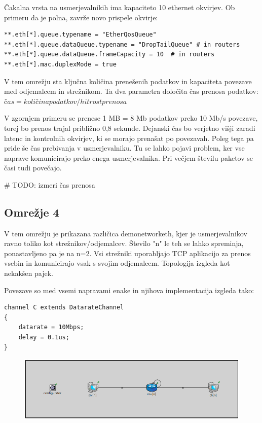 \documentclass[11pt,a4paper,slovene]{myarticle}
\begin{document}
Čakalna vrsta na usmerjevalnikih ima kapaciteto 10 ethernet okvirjev. Ob primeru da je polna, zavrže novo prispele okvirje:
\begin{lstlisting}[h]
**.eth[*].queue.typename = "EtherQosQueue"
**.eth[*].queue.dataQueue.typename = "DropTailQueue" # in routers
**.eth[*].queue.dataQueue.frameCapacity = 10  # in routers
**.eth[*].mac.duplexMode = true
\end{lstlisting}

V tem omrežju sta ključna količina prenešenih podatkov in kapaciteta povezave med odjemalcem in strežnikom. Ta dva parametra določita čas prenosa podatkov:
$čas = količina podatkov / hitrost prenosa$

V zgornjem primeru se prenese 1 MB = 8 Mb podatkov preko 10 Mb/s povezave, torej bo prenos trajal približno 0,8 sekunde. Dejanski čas bo verjetno višji zaradi latenc in kontrolnih okvirjev, ki se morajo prenašat po povezavah.
Poleg tega pa pride še čas prebivanja v usmerjevalniku. Tu se lahko pojavi problem, ker vse naprave komunicirajo preko enega usmerjevalnika.
Pri večjem številu paketov se časi tudi povečajo.

# TODO: izmeri čas prenosa

\subsection{Omrežje 4}
V tem omrežju je prikazana različica demonetworketh, kjer je usmerjevalnikov ravno toliko kot strežnikov/odjemalcev. Število "n" le teh se lahko spreminja, ponastavljeno pa je na n=2. Vsi strežniki uporabljajo TCP aplikacijo za prenos vsebin in komunicirajo vsak s svojim odjemalcem. Topologija izgleda kot nekakšen pajek.

Povezave so med vsemi napravami enake in njihova implementacija izgleda tako:
\begin{lstlisting}
channel C extends DatarateChannel
{
    datarate = 10Mbps;
    delay = 0.1us;
}
\end{lstlisting}

\begin{figure}[h]
  \includegraphics[width=\linewidth]{omrezje4.png}
\end{figure}
\end{document}
